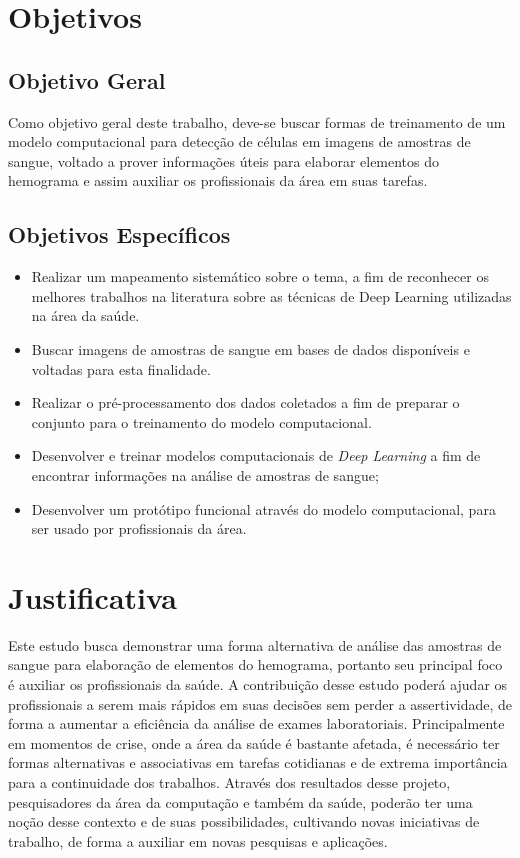 \section{Objetivos}
\label{sec:objetivos}

\subsection{Objetivo Geral}
Como objetivo geral deste trabalho, deve-se buscar formas de treinamento de um modelo computacional para detecção de células em imagens de amostras de sangue, voltado a prover informações úteis para elaborar elementos do hemograma e assim auxiliar os profissionais da área em suas tarefas.

\subsection{Objetivos Específicos}
\begin{itemize}
    \item Realizar um mapeamento sistemático sobre o tema, a fim de reconhecer os melhores trabalhos na literatura sobre as técnicas de Deep Learning utilizadas na área da saúde.
    \item Buscar imagens de amostras de sangue em bases de dados disponíveis e voltadas para esta finalidade.
    \item Realizar o pré-processamento dos dados coletados a fim de preparar o conjunto para o treinamento do modelo computacional.
    \item Desenvolver e treinar modelos computacionais de \emph{Deep Learning} a fim de encontrar informações na análise de amostras de sangue;
    \item Desenvolver um protótipo funcional através do modelo computacional, para ser usado por profissionais da área.
\end{itemize}

\section{Justificativa}
\label{sec:justificativa}
Este estudo busca demonstrar uma forma alternativa de análise das amostras de sangue para elaboração de elementos do hemograma, portanto seu principal foco é auxiliar os profissionais da saúde. A contribuição desse estudo poderá ajudar os profissionais a serem mais rápidos em suas decisões sem perder a assertividade, de forma a aumentar a eficiência da análise de exames laboratoriais. Principalmente em momentos de crise, onde a área da saúde é bastante afetada, é necessário ter formas alternativas e associativas em tarefas cotidianas e de extrema importância para a continuidade dos trabalhos. Através dos resultados desse projeto, pesquisadores da área da computação e também da saúde, poderão ter uma noção desse contexto e de suas possibilidades, cultivando novas iniciativas de trabalho, de forma a auxiliar em novas pesquisas e aplicações.

